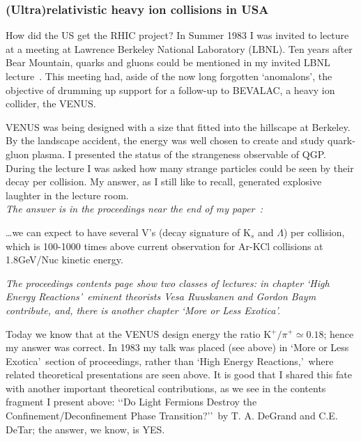 \subsubsection{(Ultra)relativistic heavy ion collisions in USA}\label{sec:RHI-US}
How did the US get the RHIC project? In Summer 1983 I was invited to lecture at a meeting at Lawrence Berkeley National Laboratory (LBNL). Ten years after Bear Mountain, quarks and gluons could be mentioned in my invited LBNL lecture~\cite{Rafelski:1983im}. This meeting had, aside of the now long forgotten \lq anomalons\rq, the objective of drumming up support for a follow-up to BEVALAC, a heavy ion collider, the VENUS.

VENUS was being designed with a size that fitted into the hillscape at Berkeley. By the landscape accident, the energy was well chosen to create and study quark-gluon plasma. I presented the status of the strangeness observable of QGP. During the lecture I was asked how many strange particles could be seen by their decay per collision. My answer, as I still like to recall, generated explosive laughter in the lecture room.\\

\noindent \textit{The answer is in the proceedings near the end of my paper~\cite{Rafelski:1983im}:}\\[-0.7cm]
% 
\begin{mdframed}[linecolor=gray,roundcorner=12pt,backgroundcolor=Dandelion!15,linewidth=1pt,leftmargin=0cm,rightmargin=0cm,topline=true,bottomline=true,skipabove=12pt]\relax%
%
\ldots we can expect to have several V's (decay signature of K$_s$ and $\Lambda$) per collision, which is 100-1000 times above current observation for Ar-KCl collisions at 1.8\;GeV/Nuc kinetic energy.\\
\centerline{}
\textit{The proceedings contents page show two classes of lectures: in chapter \lq High Energy Reactions\rq\ eminent theorists Vesa Ruuskanen and Gordon Baym contribute, and, there is another chapter \lq More or Less Exotica\rq.\label{exotica}}
\end{mdframed}
\vskip 0.5cm
Today we know that at the VENUS design energy the ratio K$^+/\pi^+\simeq 0.18$; hence my answer was correct. In 1983 my talk was placed (see above) in \lq More or Less Exotica\rq\ section of proceedings, rather than \lq High Energy Reactions,\rq\ where related theoretical presentations are seen above. It is good that I shared this fate with another important theoretical contributions, as we see in the contents fragment I present above: \lq\lq Do Light Fermions Destroy the Confinement/Deconfinement Phase Transition?\rq\rq\ by T. A. DeGrand and C.E. DeTar; the answer, we know, is YES. 

